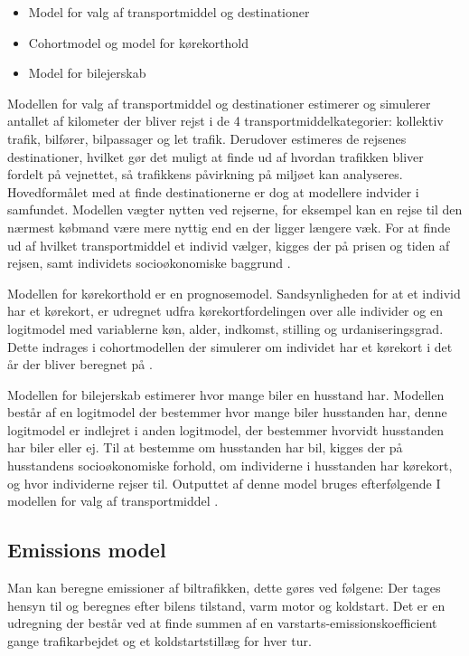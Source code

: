 \begin{itemize}
\item Model for valg af transportmiddel og destinationer
\item Cohortmodel og model for kørekorthold
\item Model for bilejerskab
\end{itemize}

Modellen for valg af transportmiddel og destinationer estimerer og simulerer antallet af kilometer der bliver rejst i de 4 transportmiddelkategorier: kollektiv trafik, bilfører, bilpassager og let trafik. Derudover estimeres de rejsenes destinationer, hvilket gør det muligt at finde ud af hvordan trafikken bliver fordelt på vejnettet, så trafikkens påvirkning på miljøet kan analyseres. Hovedformålet med at finde destinationerne er dog at modellere indvider i samfundet. Modellen vægter nytten ved rejserne, for eksempel kan en rejse til den nærmest købmand være mere nyttig end en der ligger længere væk. For at finde ud af hvilket transportmiddel et individ vælger, kigges der på prisen og tiden af rejsen, samt individets socioøkonomiske baggrund \cite[s. 26-27]{dmumodelanalyser}.

\vspace{5mm}

Modellen for kørekorthold er en prognosemodel. Sandsynligheden for at et individ har et kørekort, er udregnet udfra kørekortfordelingen over alle individer og en logitmodel med variablerne køn, alder, indkomst, stilling og urdaniseringsgrad. Dette indrages i cohortmodellen der simulerer om individet har et kørekort i det år der bliver beregnet på \cite[s. 30]{dmumodelanalyser}.

\vspace{5mm}

Modellen for bilejerskab estimerer hvor mange biler en husstand har. Modellen består af en logitmodel der bestemmer hvor mange biler husstanden har, denne logitmodel er indlejret i anden logitmodel, der bestemmer hvorvidt husstanden har biler eller ej. Til at bestemme om husstanden har bil, kigges der på husstandens socioøkonomiske forhold, om individerne i husstanden har kørekort, og hvor individerne rejser til. Outputtet af denne model bruges efterfølgende I modellen for valg af transportmiddel \cite[s. 29-30]{dmumodelanalyser}.


\subsection{Emissions model}
Man kan beregne emissioner af biltrafikken, dette gøres ved følgene: Der tages hensyn til og beregnes efter bilens tilstand, varm motor og koldstart. Det er en udregning der består ved at finde summen af en varstarts-emissionskoefficient gange trafikarbejdet og et koldstartstillæg for hver tur.

